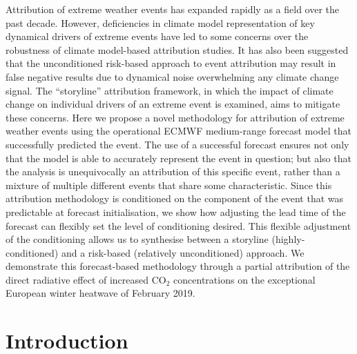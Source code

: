   Attribution of extreme weather events has expanded rapidly as a field over the past decade. However, deficiencies in climate model representation of key dynamical drivers of extreme events have led to some concerns over the robustness of climate model-based attribution studies. It has also been suggested that the unconditioned risk-based approach to event attribution may result in false negative results due to dynamical noise overwhelming any climate change signal. The “storyline” attribution framework, in which the impact of climate change on individual drivers of an extreme event is examined, aims to mitigate these concerns. Here we propose a novel methodology for attribution of extreme weather events using the operational ECMWF medium-range forecast model that successfully predicted the event. The use of a successful forecast ensures not only that the model is able to accurately represent the event in question; but also that the analysis is unequivocally an attribution of this specific event, rather than a mixture of multiple different events that share some characteristic. Since this attribution methodology is conditioned on the component of the event that was predictable at forecast initialisation, we show how adjusting the lead time of the forecast can flexibly set the level of conditioning desired. This flexible adjustment of the conditioning allows us to synthesise between a storyline (highly-conditioned) and a risk-based (relatively unconditioned) approach. We demonstrate this forecast-based methodology through a partial attribution of the direct radiative effect of increased CO$_2$ concentrations on the exceptional European winter heatwave of February 2019.

\section{Introduction}

